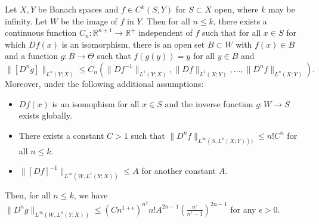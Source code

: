 \begin{theorem}\label{thm:NormInverse}
Let $X,Y$ be Banach spaces and $f\in C^k(S,Y)$ for $S\subset X$ open, where $k$ may be infinity. Let $W$ be the image of $f$ in $Y$. Then for all $n \leq k $, there exists a continuous function $C_n: \mathbb{R}^{n+1}\rightarrow \mathbb{R}^+$ independent of $f$ such that for all $x\in S$ for which $Df(x)$ is an isomorphism, there is an open set $B\subset W$ with $f(x)\in B$ and a function $g: B\rightarrow \Theta$ such that $f(g(y)) = y$ for all $y\in B$ and $$ \|[D^n g]\|_{L^n(Y;X)} \leq C_n(\|Df^{-1}\|_{L^1(Y;X)}, \|Df\|_{L^1(X;Y)}, \ldots, \|D^nf\|_{L^n(X;Y)}). $$ 
Moreover, under the following additional assumptions:
\begin{itemize}
    \item $Df(x)$ is an isomophism for all $x\in S$ and the inverse function $g:W\rightarrow S$ exists globally. 
    \item There exists a constant $C > 1$ such that  $\|D^nf\|_{L^\infty (S, L^n(X;Y)))} \leq n!C^{n}$ for all $n \leq k$. 
    \item $\|[Df]^{-1}\|_{L^\infty(W, L^1(Y;X))} \leq A$ for another constant $A$. 

\end{itemize}
Then, for all $n\leq k$, we have $\|D^ng\|_{L^\infty(W,L^n(Y;X))}\leq (Cn^{1+\epsilon})^{n^2}n!A^{2n-1}\left(\frac{n^\epsilon}{n^\epsilon - 1}\right)^{2n-1}$ for any $\epsilon > 0$. 



\end{theorem}
